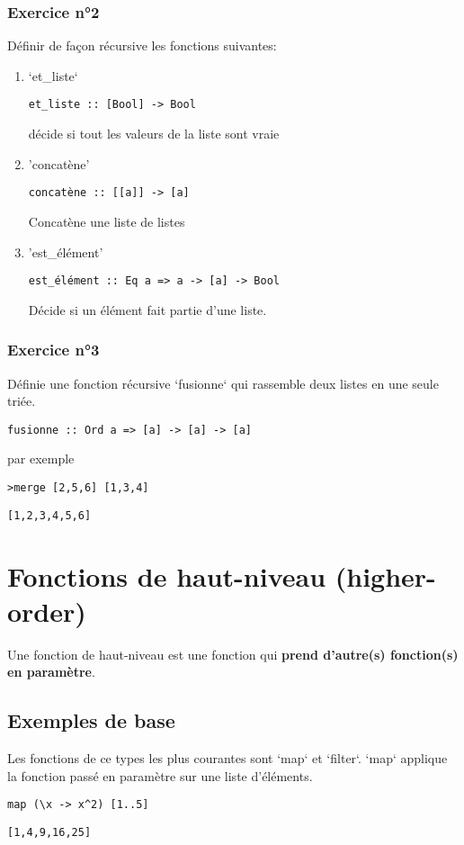 \documentclass[11pt]{article}
\begin{document}
\subsubsection{Exercice n°2}
\label{sec:orge9507ba}
Définir de façon récursive les fonctions suivantes:

\begin{enumerate}
\item `et\_liste`
\label{sec:orge79f872}
\begin{verbatim}
et_liste :: [Bool] -> Bool 
\end{verbatim}
décide si tout les valeurs de la liste sont vraie

\item 'concatène'
\label{sec:org1c7e5c6}
\begin{verbatim}
concatène :: [[a]] -> [a]
\end{verbatim}
Concatène une liste de listes

\item 'est\_élément'
\label{sec:org3c59a87}
\begin{verbatim}
est_élément :: Eq a => a -> [a] -> Bool 
\end{verbatim}
Décide si un élément fait partie d'une liste.
\end{enumerate}

\subsubsection{Exercice n°3}
\label{sec:orgc463e76}
Définie une fonction récursive `fusionne`  qui rassemble deux listes en une seule triée.
\begin{verbatim}
fusionne :: Ord a => [a] -> [a] -> [a]
\end{verbatim}
par exemple
\begin{verbatim}
>merge [2,5,6] [1,3,4]
\end{verbatim}
\begin{verbatim}
[1,2,3,4,5,6]
\end{verbatim}

\section{Fonctions de haut-niveau (higher-order)}
\label{sec:org3bbe605}
Une fonction de haut-niveau est une fonction qui \textbf{prend d'autre(s) fonction(s) en paramètre}.

\subsection{Exemples de base}
\label{sec:org55e3385}
Les fonctions de ce types les plus courantes sont `map` et `filter`. 
`map`  applique la fonction passé en paramètre sur une liste d'éléments.
\begin{verbatim}
map (\x -> x^2) [1..5]
\end{verbatim}
\begin{verbatim}
[1,4,9,16,25]
\end{verbatim}
\end{document}
